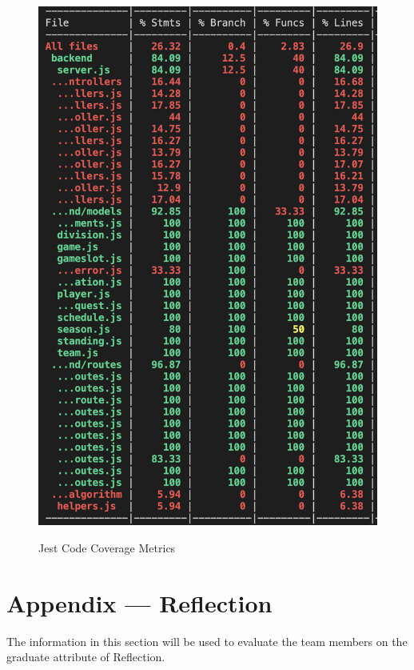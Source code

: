 \documentclass[12pt, titlepage]{article}
\begin{document}
\begin{figure}[htbp]
    \caption{Jest Code Coverage Metrics}
    \centering
    \includegraphics[width=\textwidth]{coverage.png}
    \label{fig:coverage}
\end{figure}




\newpage{}
\section*{Appendix --- Reflection}

The information in this section will be used to evaluate the team members on the
graduate attribute of Reflection.
\end{document}
